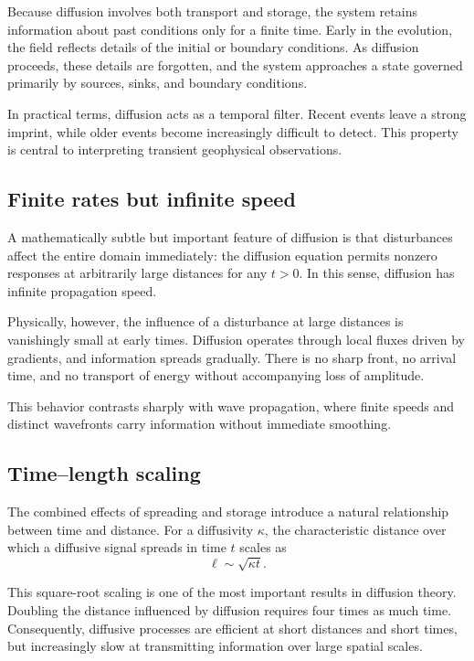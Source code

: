 Because diffusion involves both transport and storage, the system retains information about past conditions only for a finite time. Early in the evolution, the field reflects details of the initial or boundary conditions. As diffusion proceeds, these details are forgotten, and the system approaches a state governed primarily by sources, sinks, and boundary conditions.

In practical terms, diffusion acts as a temporal filter. Recent events leave a strong imprint, while older events become increasingly difficult to detect. This property is central to interpreting transient geophysical observations.

\subsection{Finite rates but infinite speed}

A mathematically subtle but important feature of diffusion is that disturbances affect the entire domain immediately: the diffusion equation permits nonzero responses at arbitrarily large distances for any $t > 0$. In this sense, diffusion has infinite propagation speed.

Physically, however, the influence of a disturbance at large distances is vanishingly small at early times. Diffusion operates through local fluxes driven by gradients, and information spreads gradually. There is no sharp front, no arrival time, and no transport of energy without accompanying loss of amplitude.

This behavior contrasts sharply with wave propagation, where finite speeds and distinct wavefronts carry information without immediate smoothing.

\subsection{Time--length scaling}

The combined effects of spreading and storage introduce a natural relationship between time and distance. For a diffusivity $\kappa$, the characteristic distance over which a diffusive signal spreads in time $t$ scales as
\[
    \ell \sim \sqrt{\kappa t}.
\]

This square-root scaling is one of the most important results in diffusion theory.  Doubling the distance influenced by diffusion requires four times as much time.  Consequently, diffusive processes are efficient at short distances and short times, but increasingly slow at transmitting information over large spatial scales.

